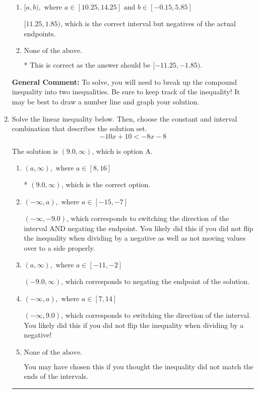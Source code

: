 \documentclass{extbook}[14pt]
\newcommand{\litem}[1]{\item #1

\rule{\textwidth}{0.4pt}}
\begin{document}
\begin{enumerate}
{\begin{enumerate}[label=\Alph*.]
$(-\infty, 11.25] \cup (1.85, \infty)$, which corresponds to displaying the and-inequality as an or-inequality and getting negatives of the actual endpoints.
\item \( [a, b), \text{ where } a \in [10.25, 14.25] \text{ and } b \in [-0.15, 5.85] \)

$[11.25, 1.85)$, which is the correct interval but negatives of the actual endpoints.
\item \( \text{None of the above.} \)

* This is correct as the answer should be $[-11.25, -1.85)$.
\end{enumerate}

\textbf{General Comment:} To solve, you will need to break up the compound inequality into two inequalities. Be sure to keep track of the inequality! It may be best to draw a number line and graph your solution.
}
\litem{
Solve the linear inequality below. Then, choose the constant and interval combination that describes the solution set.
\[ -10x + 10 < -8x -8 \]

The solution is \( (9.0, \infty) \), which is option A.\begin{enumerate}[label=\Alph*.]
\item \( (a, \infty), \text{ where } a \in [8, 16] \)

* $(9.0, \infty)$, which is the correct option.
\item \( (-\infty, a), \text{ where } a \in [-15, -7] \)

 $(-\infty, -9.0)$, which corresponds to switching the direction of the interval AND negating the endpoint. You likely did this if you did not flip the inequality when dividing by a negative as well as not moving values over to a side properly.
\item \( (a, \infty), \text{ where } a \in [-11, -2] \)

 $(-9.0, \infty)$, which corresponds to negating the endpoint of the solution.
\item \( (-\infty, a), \text{ where } a \in [7, 14] \)

 $(-\infty, 9.0)$, which corresponds to switching the direction of the interval. You likely did this if you did not flip the inequality when dividing by a negative!
\item \( \text{None of the above}. \)

You may have chosen this if you thought the inequality did not match the ends of the intervals.
\end{enumerate}

}
\end{enumerate}
\end{document}
